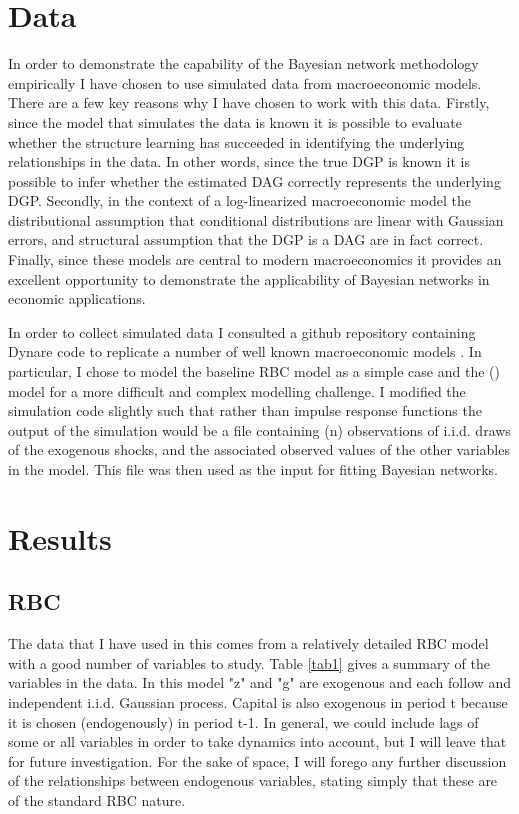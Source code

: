 \documentclass{article}
\begin{document}
\section{Data}

In order to demonstrate the capability of the Bayesian network methodology empirically I have chosen to use simulated data from macroeconomic models. There are a few key reasons why I have chosen to work with this data. Firstly, since the model that simulates the data is known it is possible to evaluate whether the structure learning has succeeded in identifying the underlying relationships in the data. In other words, since the true DGP is known it is possible to infer whether the estimated DAG correctly represents the underlying DGP. Secondly, in the context of a log-linearized macroeconomic model the distributional assumption that conditional distributions are linear with Gaussian errors, and structural assumption that the DGP is a DAG are in fact correct. Finally, since these models are central to modern macroeconomics it provides an excellent opportunity to demonstrate the applicability of Bayesian networks in economic applications.

In order to collect simulated data I consulted a github repository containing Dynare code to replicate a number of well known macroeconomic models \parencite{pfeifer2020}. In particular, I chose to model the baseline RBC model as a simple case and the \citeauthor{smets2007shocks} (\citeyear{smets2007shocks}) model for a more difficult and complex modelling challenge. I modified the simulation code slightly such that rather than impulse response functions the output of the simulation would be a file containing (n) observations of i.i.d. draws of the exogenous shocks, and the associated observed values of the other variables in the model. This file was then used as the input for fitting Bayesian networks.

\section{Results}

\subsection{RBC}

The data that I have used in this comes from a relatively detailed RBC model with a good number of variables to study. Table \ref{tab1} gives a summary of the variables in the data. In this model "z" and "g" are exogenous and each follow and independent i.i.d. Gaussian process. Capital is also exogenous in period t because it is chosen (endogenously) in period t-1. In general, we could include lags of some or all variables in order to take dynamics into account, but I will leave that for future investigation. For the sake of space, I will forego any further discussion of the relationships between endogenous variables, stating simply that these are of the standard RBC nature.
\end{document}

